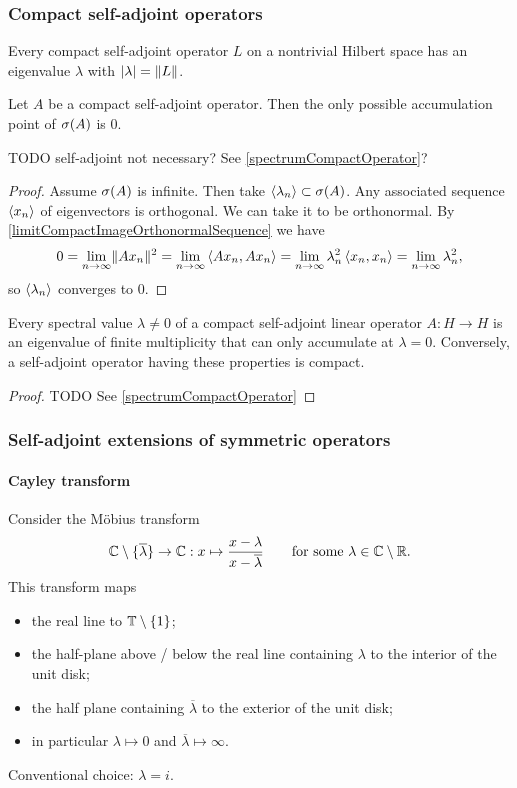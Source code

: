 \subsubsection{Compact self-adjoint operators}
\begin{proposition}
Every compact self-adjoint operator $L$ on a nontrivial Hilbert space has an eigenvalue $\lambda$ with $|\lambda| = \lVert L\rVert$.
\end{proposition}

\begin{proposition}
Let $A$ be a compact self-adjoint operator. Then the only possible accumulation point of $\sigma(A)$ is $0$.
\end{proposition}
TODO self-adjoint not necessary? See \ref{spectrumCompactOperator}?
\begin{proof}
Assume $\sigma(A)$ is infinite. Then take $\left\langle \lambda_n \right\rangle\subset \sigma(A)$. Any associated sequence $\left\langle x_n \right\rangle$ of eigenvectors is orthogonal. We can take it to be orthonormal. By \ref{limitCompactImageOrthonormalSequence} we have
\[ 0 = \lim_{n\to\infty} \lVert Ax_n\rVert^2 = \lim_{n\to\infty}\left\langle Ax_n,Ax_n \right\rangle = \lim_{n\to\infty}\lambda_n^2\left\langle x_n,x_n \right\rangle = \lim_{n\to\infty}\lambda_n^2, \]
so $\left\langle \lambda_n \right\rangle$ converges to $0$.
\end{proof}

\begin{theorem}
Every spectral value $\lambda\neq 0$ of a compact self-adjoint linear
operator $A : H \to H$ is an eigenvalue of finite multiplicity that can only
accumulate at $\lambda = 0$. Conversely, a self-adjoint operator having these
properties is compact.
\end{theorem}
\begin{proof}
TODO See \ref{spectrumCompactOperator}
\end{proof}

\subsubsection{Self-adjoint extensions of symmetric operators}
\paragraph{Cayley transform}
Consider the Möbius transform
\[ \mathbb{C}\setminus\{\overline{\lambda}\} \to \mathbb{C}: x\mapsto \frac{x - \lambda}{x-\overline{\lambda}} \qquad \text{for some $\lambda\in\mathbb{C}\setminus\mathbb{R}$.} \]
This transform maps
\begin{itemize}
\item the real line to $\mathbb{T}\setminus\{1\}$;
\item the half-plane above / below the real line containing $\lambda$ to the interior of the unit disk;
\item the half plane containing $\overline{\lambda}$ to the exterior of the unit disk;
\item in particular $\lambda \mapsto 0$ and $\overline{\lambda} \mapsto \infty$.
\end{itemize}
Conventional choice: $\lambda = i$.

